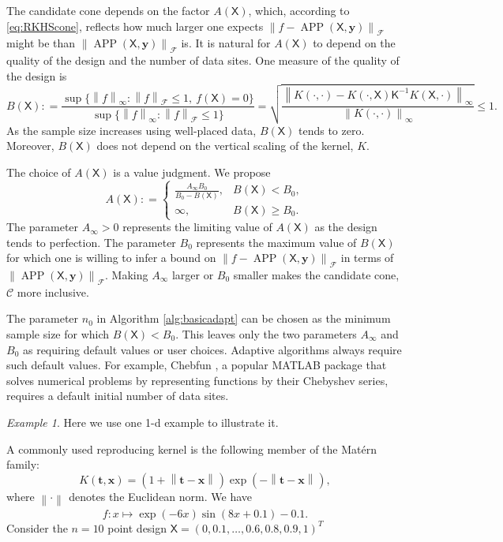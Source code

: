 \documentclass[]{mcom-l}
\theoremstyle{remark}
\newtheorem{example}{Example}
\DeclareMathOperator{\APP}{APP}
\newcommand{\mK}{\mathsf{K}}
\newcommand{\mX}{\mathsf{X}}
\newcommand{\bx}{{\boldsymbol{x}}}
\newcommand{\by}{{\boldsymbol{y}}}
\newcommand{\bt}{{\boldsymbol{t}}}
\newcommand{\cc}{\mathcal{C}}
\newcommand{\calf}{{\mathcal{F}}}
\newcommand{\norm}[2][{}]{\ensuremath{\left \lVert #2 \right \rVert}_{#1}}
\newcommand{\bignorm}[2][{}]{\ensuremath{\bigl \lVert #2 \bigr \rVert}_{#1}}
\begin{document}
The candidate cone depends on the factor $A(\mX)$, which, according to \ref{eq:RKHScone}, reflects how much larger one expects $\bignorm[\calf]{f  - \APP(\mX,\by)}$ might be than $\bignorm[\calf]{\APP(\mX,\by)}$ is.  It is natural for $A(\mX)$ to depend  on the quality of the design and the number of data sites.  One measure of the quality of the design is 
\begin{equation} \label{eq:BX}
B(\mX) : = \frac{ \sup \{\norm[\infty]{f} :  \norm[\calf]{f}  \le 1 , \ f(\mX) = 0 \}   }  {\sup \{ \norm[\infty]{f}  : \norm[\calf]{f}  \le 1  \} }
= \sqrt{ \frac{\norm[\infty]{K(\cdot,\cdot) - K(\cdot,\mX) \mK^{-1} K(\mX,\cdot)}}{\norm[\infty]{K(\cdot,\cdot)}}} \le 1.
\end{equation}
As the sample size increases using well-placed data, $B(\mX)$ tends to zero.  Moreover, $B(\mX)$ does not depend on the vertical scaling of the kernel, $K$.

The choice of $A(\mX)$ is  a value judgment.  We propose
\begin{equation} \label{eq:an}
A(\mX): = \begin{cases} \displaystyle
\frac{A_\infty B_0}{B_0 - B(\mX)}, & B(\mX) < B_0, \\
\infty, & B(\mX) \ge B_0.
\end{cases}
\end{equation}
The parameter $A_\infty > 0$ represents the limiting value of $A(\mX)$ as the design tends to perfection.  The parameter $B_0$ represents the maximum value of $B(\mX)$ for which one is willing to infer a bound on $\bignorm[\calf]{f  - \APP(\mX,\by)}$ in terms of $\bignorm[\calf]{\APP(\mX,\by)}$.  Making $A_\infty$ larger or $B_0$ smaller makes the candidate cone, $\cc$ more inclusive.

The parameter $n_0$ in Algorithm \ref{alg:basicadapt} can be chosen as the minimum sample size for which $B(\mX) < B_0$.  This leaves only the two parameters $A_\infty$ and $B_0$ as requiring default values or user choices.  Adaptive algorithms always require such default values.  For example, Chebfun \cite{DriHalTre14a}, a popular MATLAB package that solves numerical problems by representing functions by their Chebyshev series, requires a default initial number of data sites.

\begin{example}
	Here we use one 1-d example to illustrate it.
	
	A commonly used reproducing kernel is the following member of the Mat\'ern family:
	\begin{equation} \label{eq:MaternOne}
	K(\bt,\bx) = (1 +  \norm{\bt-\bx}) \exp(-\norm{\bt-\bx}),
	\end{equation}
	where $\norm{\cdot}$ denotes the Euclidean norm.
	We have \[f: x \mapsto \exp(-6x) \sin(8x+0.1) - 0.1.\]
	Consider the $n=10$ point design $\mX = (0, 0.1, \ldots, 0.6, 0.8, 0.9, 1)^T$
	
	
	
\end{example}
\end{document}
